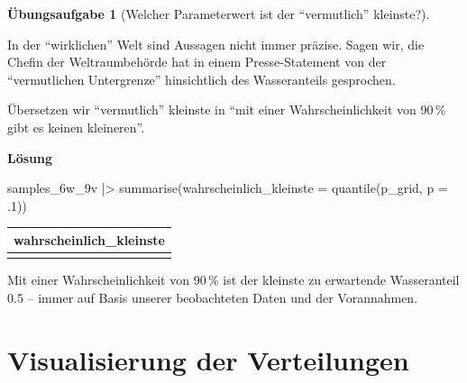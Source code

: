 \documentclass[
  ngerman,
  letterpaper,
  twoside,
  open=any]{scrbook}
\newenvironment{Shaded}{\begin{snugshade}}{\end{snugshade}}
\newcommand{\AttributeTok}[1]{\textcolor[rgb]{0.40,0.45,0.13}{#1}}
\newcommand{\DecValTok}[1]{\textcolor[rgb]{0.68,0.00,0.00}{#1}}
\newcommand{\FunctionTok}[1]{\textcolor[rgb]{0.28,0.35,0.67}{#1}}
\newcommand{\NormalTok}[1]{\textcolor[rgb]{0.00,0.23,0.31}{#1}}
\newcommand{\SpecialCharTok}[1]{\textcolor[rgb]{0.37,0.37,0.37}{#1}}
\newcounter{none} %
\theoremstyle{definition}
\theoremstyle{plain}
\theoremstyle{definition}
\newtheorem{exercise}{Übungsaufgabe}[chapter]
\theoremstyle{definition}
\theoremstyle{definition}
\theoremstyle{definition}
\newtheorem{exercise}{Übungsaufgabe}[chapter]
\theoremstyle{remark}
\begin{document}
\begin{exercise}[Welcher Parameterwert ist der \enquote{vermutlich}
kleinste?]\protect\hypertarget{exr-quant3}{}\label{exr-quant3}

In der \enquote{wirklichen} Welt sind Aussagen nicht immer präzise.
Sagen wir, die Chefin der Weltraumbehörde hat in einem Presse-Statement
von der \enquote{vermutlichen Untergrenze} hinsichtlich des
Wasseranteils gesprochen.

Übersetzen wir \enquote{vermutlich} kleinste in \enquote{mit einer
Wahrscheinlichkeit von 90\,\% gibt es keinen kleineren}.

\begin{tcolorbox}[enhanced jigsaw, arc=.35mm, bottomrule=.15mm, breakable, colback=white, colframe=quarto-callout-tip-color-frame, left=2mm, leftrule=.75mm, opacityback=0, rightrule=.15mm, toprule=.15mm]

\vspace{-3mm}\textbf{Lösung}\vspace{3mm}

\begin{Shaded}
\begin{Highlighting}[]
\NormalTok{samples\_6w\_9v }\SpecialCharTok{|\textgreater{}} 
  \FunctionTok{summarise}\NormalTok{(}\AttributeTok{wahrscheinlich\_kleinste =} 
              \FunctionTok{quantile}\NormalTok{(p\_grid, }\AttributeTok{p =}\NormalTok{ .}\DecValTok{1}\NormalTok{))}
\end{Highlighting}
\end{Shaded}

{\def\LTcaptype{none} %
\begin{longtable}[]{@{}r@{}}
\toprule\noalign{}
wahrscheinlich\_kleinste \\
\midrule\noalign{}
\endhead
\bottomrule\noalign{}
\endlastfoot
0.5 \\
\end{longtable}
}

Mit einer Wahrscheinlichkeit von 90\,\% ist der kleinste zu erwartende
Wasseranteil 0.5 -- immer auf Basis unserer beobachteten Daten und der
Vorannahmen.

\end{tcolorbox}

\end{exercise}

\section{Visualisierung der
Verteilungen}\label{visualisierung-der-verteilungen}
\end{document}
